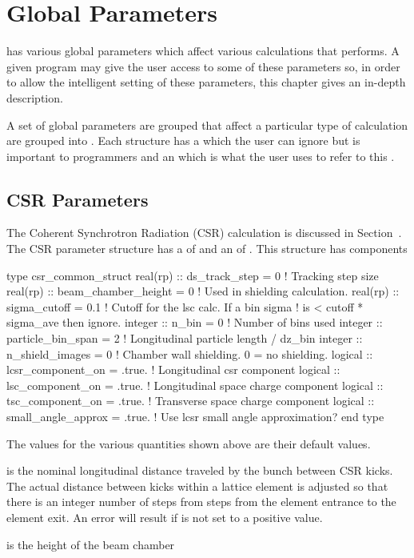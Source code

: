 \chapter{Global Parameters}

\bmad has various global parameters which affect various
calculations that \bmad performs. A given program may give the user
access to some of these parameters so, in order to allow the intelligent
setting of these parameters, this chapter gives an in-depth description.

A set of global parameters are grouped that affect a particular type
of calculation are grouped into . Each
structure has a  which the user can ignore but is 
important to programmers and an  which is what the
user uses to refer to this .

\section{CSR Parameters}
\label{s:csr_params}

The Coherent Synchrotron Radiation (CSR) calculation is discussed in
Section~. The CSR parameter structure has a 
of  and an  of .
This structure has components
\begin{example}
  type csr_common_struct 
    real(rp) :: ds_track_step = 0          ! Tracking step size
    real(rp) :: beam_chamber_height = 0    ! Used in shielding calculation.
    real(rp) :: sigma_cutoff = 0.1         ! Cutoff for the lsc calc. If a bin sigma
                                           !  is < cutoff * sigma_ave then ignore.
    integer :: n_bin = 0                   ! Number of bins used
    integer :: particle_bin_span = 2       ! Longitudinal particle length / dz_bin
    integer :: n_shield_images = 0         ! Chamber wall shielding. 0 = no shielding.
    logical :: lcsr_component_on = .true.  ! Longitudinal csr component
    logical :: lsc_component_on = .true.   ! Longitudinal space charge component
    logical :: tsc_component_on = .true.   ! Transverse space charge component
    logical :: small_angle_approx = .true. ! Use lcsr small angle approximation?
  end type
\end{example}
The values for the various quantities shown above are their default values. 

 is the nominal longitudinal distance traveled by
the bunch between CSR kicks. The actual distance between kicks within
a lattice element is adjusted so that there is an integer number of
steps from steps from the element entrance to the element
exit. An error will result if  is not set to a positive value.

 is the height of the beam chamber 
